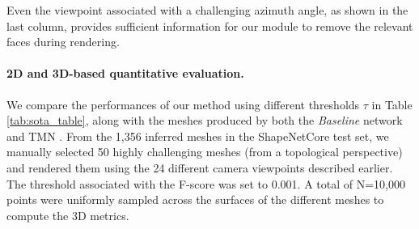 Even the viewpoint associated with a challenging azimuth angle, as shown in the last column, provides sufficient information for our module to remove the relevant faces during rendering.

\paragraph{2D and 3D-based quantitative evaluation.} We compare the performances of our method using different thresholds $\tau$ in Table \ref{tab:sota_table}, along with the meshes produced by both the \textit{Baseline} network and TMN \citep{pan2019deep}. From the 1,356 inferred meshes in the ShapeNetCore\citep{chang2015shapenet} test set, we manually selected 50 highly challenging meshes (from a topological perspective) and rendered them using the 24 different camera viewpoints described earlier. The threshold associated with the F-score was set to 0.001. A total of N=10,000 points were uniformly sampled across the surfaces of the different meshes to compute the 3D metrics. 

